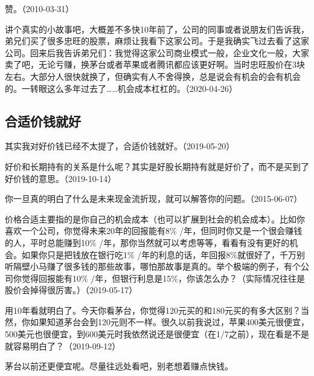 赞。（2010-03-31）

讲个真实的小故事吧，大概差不多快10年前了，公司的同事或者说朋友们告诉我，弟兄们买了很多忠旺的股票，麻烦让我看下这家公司。于是我确实飞过去看了这家公司。回来后我告诉弟兄们：我觉得这家公司商业模式一般，企业文化一般，大家卖了吧，无论亏赚，换茅台或者苹果或者腾讯都应该更好啊。当时忠旺股价在3块左右。大部分人很快就换了，但确实有人不舍得换，总是说会有机会的会有机会的。一转眼这么多年过去了……机会成本杠杠的。（2020-04-26）

\subsection{合适价钱就好}

其实我对好价钱已经不太提了，合适价钱就好。（2019-05-20）

好价和长期持有的关系是什么呢？其实是好股长期持有就是好价了，而不是买到了好价钱的意思。（2019-10-14）


你一旦真的明白了什么是未来现金流折现，就可以解答你的问题。（2015-06-07）


价格合适主要指的是你自己的机会成本（也可以扩展到社会的机会成本）。比如你喜欢一个公司，你觉得未来20年的回报能有8\% /年，但同时你又是一个很会赚钱的人，平时总能赚到10\% /年，那你当然就可以考虑等等，看看有没有更好的机会。如果你只是把钱放在银行吃1\% /年的利息的话，年回报8\%就很好了，千万别听隔壁小马赚了很多钱的那些故事，哪怕那故事是真的。举个极端的例子，有个公司你觉得回报能有10\% /年，但银行利息是15\%，你该怎么办？（实际情况往往是股价会掉得很厉害。）（2019-05-17）


用10年看就明白了。今天你看茅台，你觉得120元买的和180元买的有多大区别？当然，你如果知道茅台会到120元则不一样。很久以前我说过，苹果400美元很便宜，500美元也很便宜，到600美元时我依然说还是很便宜（在1/7之前），现在看是不是就容易明白了？（2019-09-12）


茅台以前还更便宜呢。尽量往远处看吧，别老想着赚点快钱。

